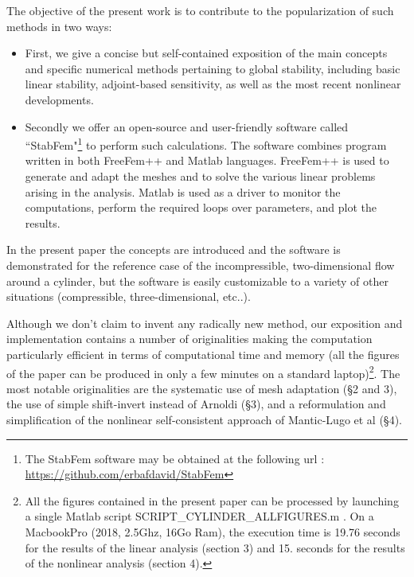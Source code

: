 \documentclass[twocolumn,10pt]{asme2ej}
\begin{document}





The objective of the present work is to contribute to the popularization of such methods 
in two ways:
\begin{itemize}
\item
First, we give a concise but self-contained exposition of the main concepts and 
specific numerical methods pertaining to global stability, including basic linear stability, adjoint-based sensitivity, as well as the most recent nonlinear developments.
\item
Secondly we offer an open-source and user-friendly software called  ``StabFem"\cprotect\footnote{The StabFem software may be obtained at the following url : 
\url{https://github.com/erbafdavid/StabFem}} 
to perform such calculations. The software combines program written in both FreeFem++ and Matlab languages. 
FreeFem++ is used to generate and adapt the meshes and to solve the various linear problems arising in the analysis. Matlab is used as a driver to monitor the computations, perform the required loops over parameters, and plot the results.
\end{itemize}

In the present paper the concepts are introduced and the software is demonstrated for the reference case of the incompressible, two-dimensional flow around a cylinder, but the software is easily customizable to a variety of other situations (compressible, three-dimensional, etc..).

Although we don't claim to invent any radically new method, our exposition and implementation contains a number of originalities making the computation particularly efficient in terms of computational time and memory (all the figures of the paper can be produced in only a few minutes on a standard laptop)\footnote{All the figures contained in the present paper can be processed by launching a single Matlab script SCRIPT\_CYLINDER\_ALLFIGURES.m . On a MacbookPro (2018,  2.5Ghz, 16Go Ram),  the execution time is 19.76 seconds for the results of the linear analysis (section 3) and 15. seconds for the results of the nonlinear analysis (section 4).
}. 
The most notable originalities are the systematic use of mesh adaptation (\S 2 and 3), the use of simple shift-invert instead of Arnoldi (\S 3), and a reformulation and simplification of the nonlinear self-consistent approach of Mantic-Lugo et al  (\S 4).
 
\end{document}
